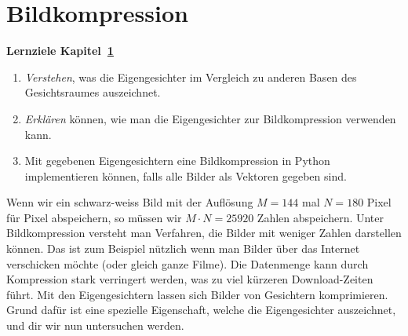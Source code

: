 \section{Bildkompression} \label{sec:compression}
\begin{tcolorbox}
	\centerline{\textbf{Lernziele Kapitel~\ref{sec:compression}}}
	\begin{enumerate}[leftmargin=*,label=\thesection.\arabic*]
		\item \textit{Verstehen}, was die Eigengesichter im Vergleich zu anderen Basen des Gesichtsraumes auszeichnet.
		\item \textit{Erklären} können, wie man die Eigengesichter zur Bildkompression verwenden kann.
		\item Mit gegebenen Eigengesichtern eine Bildkompression in Python implementieren können, falls alle Bilder als Vektoren gegeben sind.
	\end{enumerate}
\end{tcolorbox}
Wenn wir ein schwarz-weiss Bild mit der Auflösung $M=144$ mal $N=180$ Pixel für Pixel abspeichern, so müssen wir $M\cdot N=25920$ Zahlen abspeichern.
Unter Bildkompression versteht man Verfahren, die Bilder mit weniger Zahlen darstellen können.
Das ist zum Beispiel nützlich wenn man Bilder über das Internet verschicken möchte (oder gleich ganze Filme).
Die Datenmenge kann durch Kompression stark verringert werden, was zu viel kürzeren Download-Zeiten führt.
Mit den Eigengesichtern lassen sich Bilder von Gesichtern komprimieren.
Grund dafür ist eine spezielle Eigenschaft, welche die Eigengesichter auszeichnet, und dir wir nun untersuchen werden.

